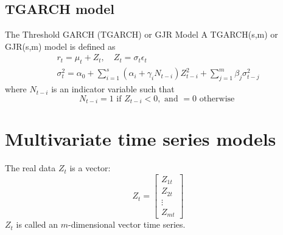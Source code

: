\documentclass{article}
\begin{document}
\subsection{TGARCH model}
The Threshold GARCH (TGARCH) or GJR Model A TGARCH(s,m) or GJR(s,m) model is defined as
\begin{equation*}
\begin{array}{c}{r_{t}=\mu_{t}+Z_{t}, \quad Z_{t}=\sigma_{t} \epsilon_{t}} \\ {\sigma_{t}^{2}=\alpha_{0}+\sum_{i=1}^{s}\left(\alpha_{i}+\gamma_{i} N_{t-i}\right) Z_{t-i}^{2}+\sum_{j=1}^{m} \beta_{j} \sigma_{t-j}^{2}}\end{array}
\end{equation*}
where $N_{t-i}$ is an indicator variable such that
\begin{equation*}
N_{t-i}=1 \text { if } Z_{t-i}<0, \text { and } = 0 \text{ otherwise }
\end{equation*}

\section{Multivariate time series models}
The real data $Z_t$ is a vector:
\begin{equation*}
Z_{t}=\left[ \begin{array}{c}{Z_{1 t}} \\ {Z_{2 t}} \\ {\vdots} \\ {Z_{m t}}\end{array}\right]
\end{equation*}
$Z_t$ is called an $m$-dimensional vector time series.
\end{document}
